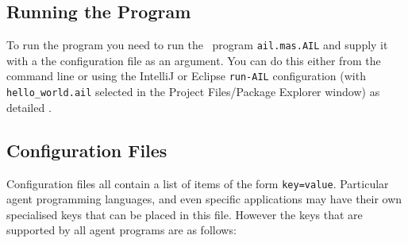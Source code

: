 \subsection{Running the Program}

To run the program you need to run the \java\ program \texttt{ail.mas.AIL} and supply it with a the configuration file as an argument.  You can do this either from the command line or using the IntelliJ or Eclipse \texttt{run-AIL} configuration (with \texttt{hello\_world.ail} selected in the Project Files/Package Explorer window) as detailed .

\subsection{Configuration Files}
\label{sec:configuration}

Configuration files all contain a list of items of the form \texttt{key=value}.  Particular agent programming languages, and even specific applications may have their own specialised keys that can be placed in this file.  However the keys that are supported by all agent programs are as follows:

